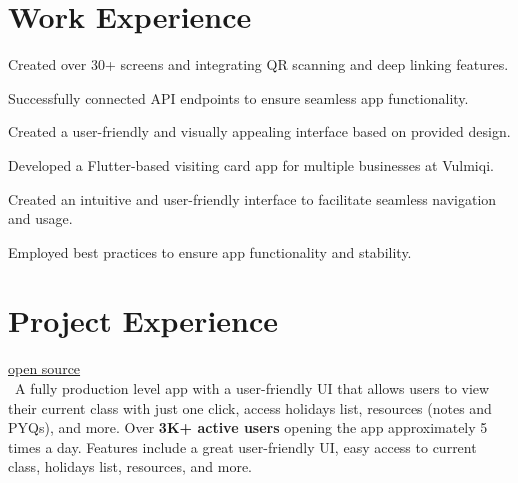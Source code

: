 \documentclass[]{resume}
\begin{document}
\begin{minipage}[t]{0.66\textwidth}

    \section{Work Experience}

    \vspace{\topsep} %
    \begin{tightemize}
        \item Created over 30+ screens and integrating QR scanning and deep linking features.
        \item Successfully connected API endpoints to ensure seamless app functionality.
        \item Created a user-friendly and visually appealing interface based on provided design.
    \end{tightemize}
    \sectionsep

    \begin{tightemize}
        \item Developed a Flutter-based visiting card app for multiple businesses at Vulmiqi.
        \item Created an intuitive and user-friendly interface to facilitate seamless navigation and usage.
        \item Employed best practices to ensure app functionality and stability.
    \end{tightemize}
    \sectionsep

    \section{Project Experience}

    \hfill\href{https://github.com/4-alok/class-links}{open source}
    \\\
    \hspace{1cm}\fontsize{10}{12}\selectfont A fully production level app with a user-friendly UI that allows users to view their current class with just one click, access holidays list, resources (notes and PYQs), and more. Over \textbf{3K+ active users} opening the app approximately 5 times a day. Features include a great user-friendly UI, easy access to current class, holidays list, resources, and more.
    \descriptright{Flutter, Dart, Python, Go}
    \sectionsep


\end{minipage}
\end{document}
